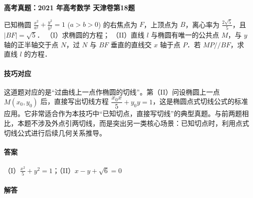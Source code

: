 \documentclass[UTF8,a4paper,11pt]{ctexart}
\newenvironment{gaokao}[1]{\par\medskip\noindent\textbf{高考真题：#1}\par\smallskip}{\par\medskip}
\begin{document}
\begin{gaokao}{2021 年高考数学 天津卷第18题}

已知椭圆 $\frac{x^2}{a^2} + \frac{y^2}{b^2} = 1$ ($a > b > 0$) 的右焦点为 $F$，上顶点为 $B$，离心率为 $\frac{2\sqrt{5}}{5}$，且 $|BF| = \sqrt{5}$．
（I）求椭圆的方程；
（II）直线 $l$ 与椭圆有唯一的公共点 $M$，与 $y$ 轴的正半轴交于点 $N$，过 $N$ 与 $BF$ 垂直的直线交 $x$ 轴于点 $P$．若 $MP // BF$，求直线 $l$ 的方程．

\begin{center}


\end{center}

\paragraph{技巧对应}

这道题对应的是“过曲线上一点作椭圆的切线”。第（II）问设椭圆上一点 $M(x_0,y_0)$ 后，直接写出切线方程 $\dfrac{x_0x}{5}+y_0y=1$，这是椭圆点式切线公式的标准应用。它非常适合作为本技巧中“已知切点，直接写切线”的典型真题。与前两题相比，本题不涉及外点引两切线，而是突出另一类核心场景：已知切点时，利用点式切线公式进行后续几何关系推导。

\paragraph{答案}

（I）$\frac{x^2}{5} + y^2 = 1$；（II）$x - y + \sqrt{6} = 0$

\paragraph{解答}


\end{gaokao}
\end{document}
